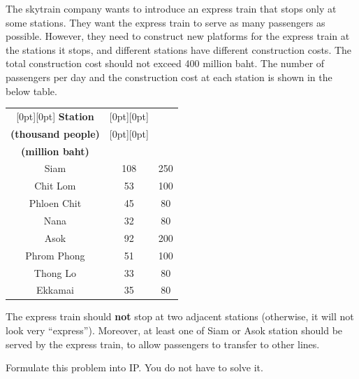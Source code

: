 \documentclass[a4paper, 10pt]{article}
\begin{document}
\begin{problem}
The skytrain company wants to introduce an express train that stops only at some stations.
They want the express train to serve as many passengers as possible.
However, they need to construct new platforms for the express train at the stations it stops, and different stations have different construction costs.
The total construction cost should not exceed 400 million baht.
The number of passengers per day and the construction cost at each station is shown in the below table.

\begin{center}
\renewcommand{\arraystretch}{1.2}
\begin{tabular}{|c|c|c|}
\hline
\rule{0pt}{3em}
\raisebox{1em}[0pt][0pt]{ \textbf{Station} } &
\raisebox{1em}[0pt][0pt]{ \makecell{ \textbf{Passengers per day} \\ \textbf{(thousand people)} } } &
\raisebox{1em}[0pt][0pt]{ \makecell{ \textbf{Construction cost} \\ \textbf{(million baht)} } } \\
\hline
Siam & 108 & 250 \\
Chit Lom & 53 & 100 \\
Phloen Chit & 45 & 80 \\
Nana & 32 & 80 \\
Asok & 92 & 200 \\
Phrom Phong & 51 & 100 \\
Thong Lo & 33 & 80 \\
Ekkamai & 35 & 80 \\
\hline
\end{tabular}
\end{center}

\par\noindent The express train should \textbf{not} stop at two adjacent stations (otherwise, it will not look very ``express'').
Moreover, at least one of Siam or Asok station should be served by the express train, to allow passengers to transfer to other lines.

\vspace{3mm}

\par\noindent Formulate this problem into IP. You do not have to solve it.
\end{problem}
\end{document}
